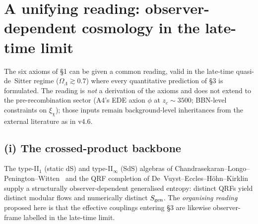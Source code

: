 %
%
%

\section{A unifying reading: observer-dependent cosmology in the late-time limit}
\label{sec:thesis}

The six axioms of \S1 can be given a common reading, valid in the
late-time quasi-de~Sitter regime ($\Omega_\Lambda \gtrsim 0.7$) where
every quantitative prediction of \S3 is formulated. The reading is
\emph{not} a derivation of the axioms and does not extend to the
pre-recombination sector (A4's EDE axion $\phi$ at
$z_c \sim 3500$; BBN-level constraints on $\xi_\chi$); those inputs
remain background-level inheritances from the external literature as
in v4.6.

\subsection*{(i) The crossed-product backbone}

The type-II$_1$ (static dS) and type-II$_\infty$ (SdS) algebras of
Chandrasekaran--Longo--Penington--Witten~\cite{CLPW2023} and the QRF
completion of De~Vuyst--Eccles--H\"ohn--Kirklin~\cite{DEHK2025a,DEHK2025b}
supply a structurally observer-dependent generalised entropy:
distinct QRFs yield distinct modular flows and numerically distinct
$S_{\rm gen}$. %
The \emph{organising reading} proposed here is that the effective
couplings entering \S3 are likewise observer-frame labelled in the
late-time limit.

